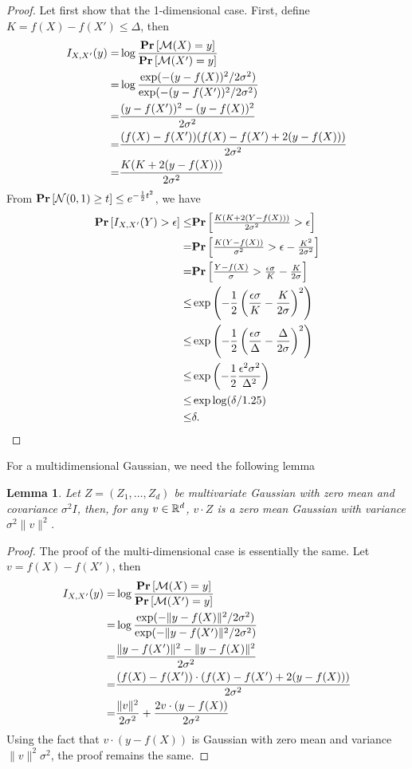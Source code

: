 \documentclass[11pt, a4paper]{article}
\newtheorem{lemma}{Lemma}
\begin{document}
\begin{proof}
Let first show that the 1-dimensional case.
First, define $K = f(X) - f(X') \leq \Delta$, then
\begin{align}
    I_{X,X'}(y) =&\log \frac{\Prob{\cM(X)=y}}{\Prob{\cM(X')=y}} \\
    =& \log\frac{\exp(-(y-f(X))^2/2\sigma^2)}{\exp(-(y-f(X'))^2/2\sigma^2)}\\
    =& \frac{(y-f(X'))^2 - (y-f(X))^2}{2\sigma^2}\\
    =& \frac{(f(X) - f(X')) (f(X)-f(X') + 2(y-f(X)))}{2\sigma^2}\\
    =& \frac{K(K + 2(y-f(X)))}{2\sigma^2}
\end{align}
From $\Prob{\mathcal{N}(0, 1) \geq t}\leq e^{-\frac{1}{2}t^2}$, we have
\begin{align}
    \Prob{I_{X,X'}(Y) >\epsilon} 
    \leq &\Prob {\frac{K(K + 2(Y-f(X)))}{2\sigma^2} > \epsilon}\\
    =&\Prob {\frac{K(Y-f(X)) }{\sigma^2} > \epsilon- \frac{K^2}{2\sigma^2}}\\
    =&\Prob {\frac{Y-f(X) }{\sigma} > \frac{\epsilon\sigma}{K}- \frac{K}{2\sigma}}\\
    \leq& \exp\left(-\frac{1}{2}\left(\frac{\epsilon\sigma}{K}- \frac{K}{2\sigma}\right)^2\right)\\
    \leq& \exp\left(-\frac{1}{2}\left(\frac{\epsilon\sigma}{\Delta}- \frac{\Delta}{2\sigma}\right)^2\right)\\
    \leq& \exp\left(-\frac{1}{2}\frac{\epsilon^2\sigma^2}{\Delta^2}\right)\\
    \leq& \exp \log (\delta/1.25)\\
    \leq& \delta.
\end{align}

\end{proof}
For a multidimensional Gaussian, we need the following lemma
\begin{lemma}
    Let $Z = (Z_1, \dots, Z_d)$ be multivariate Gaussian with zero mean and covariance $\sigma^2 I$,
    then, for any $v\in\mathbb{R}^d$, $v\cdot Z$ is a zero mean Gaussian with variance $\sigma^2 \|v\|^2$.
\end{lemma}
\begin{proof}
    The proof of the multi-dimensional case is essentially the same.
    Let $v = f(X) - f(X')$, then
    \begin{align}
        I_{X,X'}(y) =&\log \frac{\Prob{\cM(X)=y}}{\Prob{\cM(X')=y}} \\
        =& \log\frac{\exp(-\|y-f(X)\|^2/2\sigma^2)}{\exp(-\|y-f(X')\|^2/2\sigma^2)}\\
        =& \frac{\|y-f(X')\|^2 - \|y-f(X)\|^2}{2\sigma^2}\\
        =& \frac{(f(X) - f(X'))\cdot (f(X)-f(X') + 2(y-f(X)))}{2\sigma^2}\\
        =& \frac{\|v\|^2}{2\sigma^2} + \frac{2v\cdot (y-f(X))}{2\sigma^2}
    \end{align}
    Using the fact that $v\cdot (y-f(X))$ is Gaussian with zero mean and variance $\|v\|^2\sigma^2$,
    the proof remains the same.
\end{proof}
\end{document}
